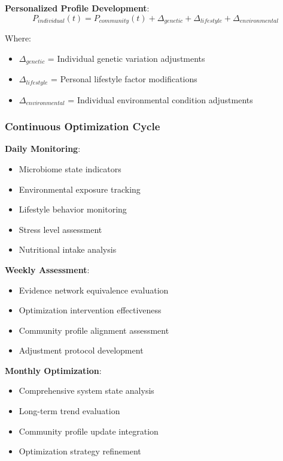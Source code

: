 \documentclass[12pt,a4paper]{article}
\begin{document}
\textbf{Personalized Profile Development}:
\begin{equation}
P_{individual}(t) = P_{community}(t) + \Delta_{genetic} + \Delta_{lifestyle} + \Delta_{environmental}
\end{equation}

Where:
\begin{itemize}
\item $\Delta_{genetic}$ = Individual genetic variation adjustments
\item $\Delta_{lifestyle}$ = Personal lifestyle factor modifications
\item $\Delta_{environmental}$ = Individual environmental condition adjustments
\end{itemize}

\subsubsection{Continuous Optimization Cycle}

\textbf{Daily Monitoring}:
\begin{itemize}
\item Microbiome state indicators
\item Environmental exposure tracking
\item Lifestyle behavior monitoring
\item Stress level assessment
\item Nutritional intake analysis
\end{itemize}

\textbf{Weekly Assessment}:
\begin{itemize}
\item Evidence network equivalence evaluation
\item Optimization intervention effectiveness
\item Community profile alignment assessment
\item Adjustment protocol development
\end{itemize}

\textbf{Monthly Optimization}:
\begin{itemize}
\item Comprehensive system state analysis
\item Long-term trend evaluation
\item Community profile update integration
\item Optimization strategy refinement
\end{itemize}
\end{document}
